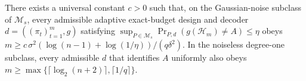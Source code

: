 There exists a universal constant \(c>0\) such that, on the Gaussian-noise subclass of \(\mathcal M_s\), every admissible adaptive exact-budget design and decoder \(d=((\pi_t)_{t=1}^m,g)\) satisfying \(\sup_{P\in\mathcal M_s}\Pr_{P,d}(g(\mathscr H_m)\ne A)\le\eta\) obeys \(m\ge c\,\sigma^2(\log(n-1)+\log(1/\eta))/(q\delta^2)\). In the noiseless degree-one subclass, every admissible \(d\) that identifies \(A\) uniformly also obeys \(m\ge\max\{\lceil\log_2(n+2)\rceil,\lceil1/q\rceil\}\).